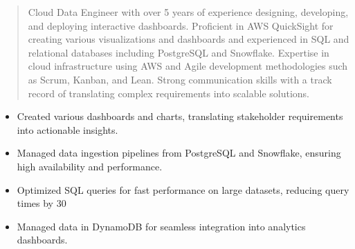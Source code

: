 




\makecvheader

\begin{quote}
  \noindent
  Cloud Data Engineer with over 5 years of experience designing, developing, and deploying interactive dashboards. Proficient in AWS QuickSight for creating various visualizations and dashboards and experienced in SQL and relational databases including PostgreSQL and Snowflake. Expertise in cloud infrastructure using AWS and Agile development methodologies such as Scrum, Kanban, and Lean. Strong communication skills with a track record of translating complex requirements into scalable solutions.
\end{quote}

\par\smallskip
\noindent
\begin{minipage}{20cm}
  \begin{minipage}{9.75cm}
    \begin{itemize}
      \item Created various dashboards and charts, translating stakeholder requirements into actionable insights.
      \item Managed data ingestion pipelines from PostgreSQL and Snowflake, ensuring high availability and performance.
    \end{itemize}
  \end{minipage}
  \hfill
  \begin{minipage}{9.75cm}
    \begin{itemize}
      \item Optimized SQL queries for fast performance on large datasets, reducing query times by 30%
      \item Managed data in DynamoDB for seamless integration into analytics dashboards.
    \end{itemize}
  \end{minipage}
\end{minipage}
\par\smallskip
\divider

